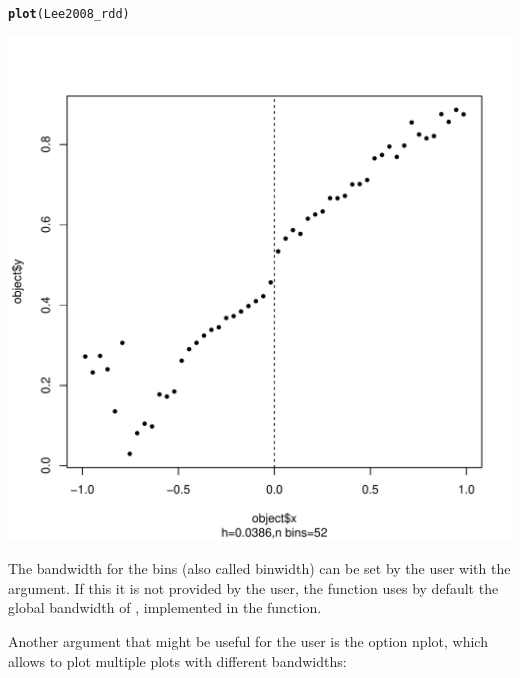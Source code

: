 \documentclass[english,nojss]{jss}\usepackage{graphicx, color}
\makeatletter
\def\maxwidth{ %
  \ifdim\Gin@nat@width>\linewidth
    \linewidth
  \else
    \Gin@nat@width
  \fi
}
\newcommand{\hlfunctioncall}[1]{\textcolor[rgb]{0.501960784313725,0,0.329411764705882}{\textbf{#1}}}%
\newenvironment{kframe}{%
 \def\at@end@of@kframe{}%
 \ifinner\ifhmode%
  \def\at@end@of@kframe{\end{minipage}}%
  \begin{minipage}{\columnwidth}%
 \fi\fi%
 \def\FrameCommand##1{\hskip\@totalleftmargin \hskip-\fboxsep
 \colorbox{shadecolor}{##1}\hskip-\fboxsep
     \hskip-\linewidth \hskip-\@totalleftmargin \hskip\columnwidth}%
 \MakeFramed {\advance\hsize-\width
   \@totalleftmargin\z@ \linewidth\hsize
   \@setminipage}}%
 {\par\unskip\endMakeFramed%
 \at@end@of@kframe}
\newenvironment{knitrout}{}{} %
\makeatother
\begin{document}
\begin{knitrout}
\color{fgcolor}\begin{kframe}
\begin{alltt}
\hlfunctioncall{plot}(Lee2008_rdd)
\end{alltt}


{\ttfamily\noindent\color{warningcolor}{\#\# Warning: font width unknown for character 0x9}}\end{kframe}
\includegraphics[width=\maxwidth]{figure/unnamed-chunk-4} 

\end{knitrout}


The bandwidth for the bins (also called binwidth) can be set by the
user with the  argument. If this it is not provided by the
user, the function uses by default the global bandwidth of \citet{RuppertSheatherEtAl1995},
implemented in the  function. 

Another argument that might be useful for the user is the option nplot,
which allows to plot multiple plots with different bandwidths:
\end{document}
